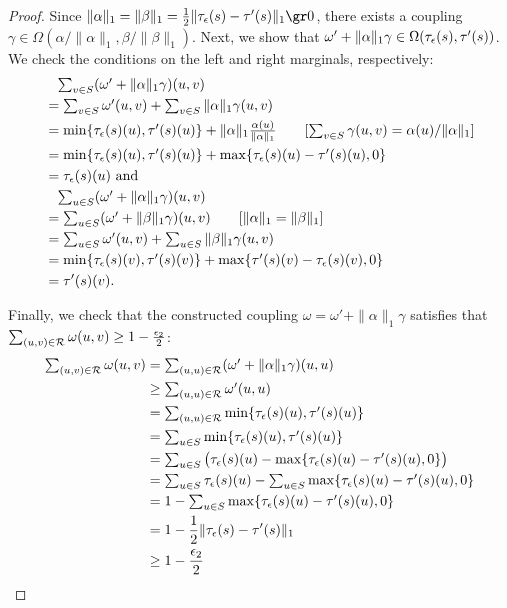 \begin{proof}
	Since $\|\alpha\|_1 = \|\beta\|_1 = \frac{1}{2} \|\tauHyp(s)-\tau'(s)\|_1 \gr 0$, there exists a coupling $\gamma \in \Omega(\alpha/\|\alpha\|_1, \beta/ \|\beta\|_1)$. Next, we show that $\omega'+\|\alpha\|_1\gamma \in \Omega(\tau_{\epsilon}(s), \tau'(s))$. We check the conditions on the left and right marginals, respectively:
	\begin{align*}
	& \phantom{=} \textstyle\sum_{v \in S} (\omega'+\|\alpha\|_1\gamma)(u, v) \\
	&= \textstyle\sum_{v \in S} \omega'(u, v)+\sum_{v \in S} \|\alpha\|_1\gamma(u, v)\\
	&= \textstyle\min\{\tau_{\epsilon}(s)(u), \tau'(s)(u)\} + \|\alpha\|_1\frac{\alpha(u)}{\|\alpha\|_1} \hspace{2em} [\mbox{$\sum_{v \in S} \gamma(u, v) = \alpha(u) / \|\alpha\|_1$}]\\
	&= \textstyle\min\{\tau_{\epsilon}(s)(u), \tau'(s)(u)\}  +  \max\{\tau_{\epsilon}(s)(u)-\tau'(s)(u), 0\} \\
	&= \tau_{\epsilon}(s)(u) \text{ and }\\
	&\phantom{=} \textstyle\sum_{u\in S} (\omega'+\|\alpha\|_1\gamma)(u, v) \\
	&=\textstyle\sum_{u\in S} (\omega'+\|\beta\|_1\gamma)(u, v) \hspace{2em} [\mbox{$\|\alpha\|_1 = \|\beta\|_1$}]\\
	&= \textstyle\sum_{u \in S} \omega'(u, v)+\sum_{u \in S} \|\beta\|_1\gamma(u, v) \\
	&= \textstyle\min\{\tau_{\epsilon}(s)(v), \tau'(s)(v)\}  +  \max\{\tau'(s)(v)-\tau_{\epsilon}(s)(v), 0\} \\
	&= \tau'(s)(v).
	\end{align*}
	
	Finally, we check that the constructed coupling $\omega = \omega'+\|\alpha\|_1\gamma$ satisfies that $\textstyle\sum_{(u, v) \in \mathcal{R}} \omega(u, v) \ge 1 - \frac{\epsilon_2}{2}$: 
	\begin{align*}
	\textstyle\sum_{(u, v)\in \mathcal{R}}\omega (u, v) &=\textstyle\sum_{(u, u) \in \mathcal{R}} (\omega'+\|\alpha\|_1\gamma)(u, u) \\
	&\ge \textstyle\sum_{(u, u) \in \mathcal{R}} \omega'(u, u) \\
	&= \textstyle\sum_{(u, u) \in \mathcal{R}} \min\{\tau_{\epsilon}(s)(u), \tau'(s)(u)\} \\	
	&=\textstyle\sum_{u \in S} \min\{\tau_{\epsilon}(s)(u), \tau'(s)(u)\}\\
	&=\textstyle\sum_{u \in S} \big( \tau_{\epsilon}(s)(u) - \max\{\tau_{\epsilon}(s)(u) - \tau'(s)(u), 0\} \big)\\
	&=\textstyle\sum_{u \in S} \tau_{\epsilon}(s)(u) - \sum_{u \in S} \max\{\tau_{\epsilon}(s)(u) - \tau'(s)(u), 0\}\\	
	&=1 - \textstyle\sum_{u \in S} \max\{\tau_{\epsilon}(s)(u) - \tau'(s)(u), 0\}\\	
	&=1 - \frac{1}{2} \|\tau_{\epsilon}(s)-\tau'(s)\|_1\\		
	&\ge 1 - \frac{\epsilon_2}{2}\qedhere
	\end{align*}
\end{proof}


